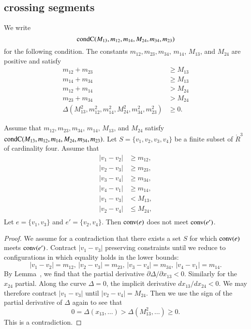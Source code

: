\newpage

\subsection{crossing segments}

\def\condface{\op{condF}}
\def\condcross{\op{condC}}
\def\condskinny{\op{condS}}

\begin{definition}[$\condcross$]
We write
	$$
	\condcross(M_{13},m_{12},m_{14},M_{24},m_{34},m_{23})
	$$
for the following condition.
The constants  $m_{12},m_{23},m_{34}$,  $m_{14}$, 
$M_{13}$, and $M_{24}$ are positive and satisfy
	$$
	\begin{array}{rll}
	m_{12} + m_{23} &\ge M_{13}\\
	m_{14} + m_{34} &\ge M_{13}\\
	m_{12} + m_{14} &> M_{24}\\
	m_{23} + m_{34} &> M_{24}\\
	\Delta(M^2_{13},m^2_{12},m^2_{14},M^2_{24},
		m^2_{34},m^2_{23}) &\ge 0.
	\end{array}
	$$
\end{definition}

\begin{lemma} 
Assume that  $m_{12},m_{23},m_{34}$,  $m_{14}$, 
$M_{13}$, and $M_{24}$ satisfy 
  $\condcross(M_{13},m_{12},m_{14},M_{24},m_{34},m_{23})$.
Let $S=\{v_1,v_2,v_3,v_4\}$ be a finite subset
of $\ring{R}^3$ of cardinality four.
Assume that
	$$
	\begin{array}{lll}
	|v_1-v_2|&\ge m_{12},\\
	|v_2-v_3|&\ge m_{23},\\
	|v_3-v_4|&\ge m_{34},\\
	|v_4-v_1|&\ge m_{14},\\
	|v_1-v_3|&< M_{13},\\
	|v_2-v_4|&\le M_{24},\\
	\end{array}
	$$  
Let $e = \{v_1,v_3\}$ and $e'=\{v_2,v_4\}$.
Then ${\operatorname{conv}} (e)$ does not meet ${\operatorname{conv}} (e')$.    	
\end{lemma}


\begin{proof} 
We assume for a contradiction that there exists a set $S$ for
which ${\operatorname{conv}}(e)$ meets ${\operatorname{conv}}(e')$.  Contract $|v_1-v_3|$
preserving constraints until we
reduce to configurations in which equality
holds in the lower bounds:
	$$|v_1-v_2|=m_{12},\ |v_2-v_3|=m_{23},\ |v_3-v_4|=m_{34},\ 
      |v_4-v_1|=m_{14}.$$   
By Lemma~, we find that the partial derivative
$\partial\Delta/\partial x_{13}<0$.   Similarly for the $x_{24}$ partial.
Along the curve $\Delta=0$, the implicit derivative $d x_{13}/d x_{24} <0$.  
We may therefore contract $|v_1-v_3|$ until $|v_2-v_4|=M_{24}$.  Then we use
the sign of the partial derivative of $\Delta$ again to see that
   $$0 = \Delta(x_{13},\ldots) > \Delta(M^2_{13},\ldots) \ge 0.$$
This is a contradiction.
\end{proof}

